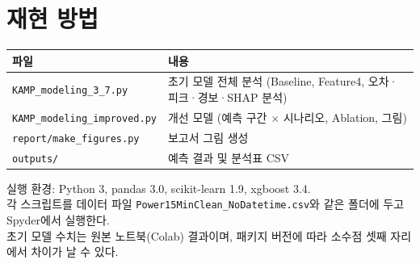 \documentclass[11pt,a4paper]{article}
\newcommand{\code}[1]{\texttt{\small #1}}
\begin{document}
\appendix
\section{재현 방법}
\begin{table}[H]
\centering\small
\begin{tabular}{p{5.2cm}p{9cm}}
\toprule
파일 & 내용 \\
\midrule
\code{KAMP\_modeling\_3\_7.py} & 초기 모델 전체 분석 (Baseline, Feature4, 오차·피크·경보·SHAP 분석) \\
\code{KAMP\_modeling\_improved.py} & 개선 모델 (예측 구간 $\times$ 시나리오, Ablation, 그림) \\
\code{report/make\_figures.py} & 보고서 그림 생성 \\
\code{outputs/} & 예측 결과 및 분석표 CSV \\
\bottomrule
\end{tabular}
\end{table}

실행 환경: Python 3, pandas 3.0, scikit-learn 1.9, xgboost 3.4.\\
각 스크립트를 데이터 파일 \code{Power15MinClean\_NoDatetime.csv}와 같은 폴더에 두고 Spyder에서 실행한다.\\
초기 모델 수치는 원본 노트북(Colab) 결과이며, 패키지 버전에 따라 소수점 셋째 자리에서 차이가 날 수 있다.
\end{document}
